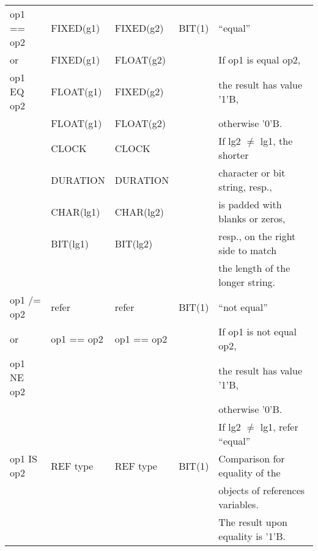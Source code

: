 \begin{table}
\begin{center}
\begin{tabular}{|l|l|l|l|l|}
op1 == op2       & FIXED(g1)       & FIXED(g2)       & BIT(1)               & ``equal''\\
or               & FIXED(g1)       & FLOAT(g2)       &                      & If op1 is equal op2,\\
op1 EQ op2
\index{EQ@\textbf{EQ}|textbf}
       & FLOAT(g1)       & FIXED(g2)       &                      & the result has value '1'B,\\
                 & FLOAT(g1)       & FLOAT(g2)       &                      & otherwise '0'B.\\
                 & CLOCK           & CLOCK           &                      & If lg2 $\neq$ lg1, the shorter\\
                 & DURATION        & DURATION        &                      & character or bit string, resp.,\\
                 & CHAR(lg1)       & CHAR(lg2)       &                      & is padded with blanks or zeros,\\
                 & BIT(lg1)        & BIT(lg2)        &                      & resp., on the right side to match\\
                 &                 &                 &                      & the length of the longer string.\\ \hline

op1 /= op2       & refer         & refer         & BIT(1)               & ``not equal''\\
or               & op1 == op2     & op1 == op2     &                      & If op1 is not equal op2,\\
op1 NE op2
\index{NE@\textbf{NE}|textbf}
       &                 &                 &                      & the result has value '1'B,\\
                 &                 &                 &                      & otherwise '0'B.\\
                 &                 &                 &                      & If lg2 $\neq$ lg1, refer ``equal''\\ \hline

op1 IS op2
\index{IS@\textbf{IS}|textbf}
       & REF type        & REF type        & BIT(1)               & Comparison for equality of the\\
                 &                 &                 &                      & objects of references variables.\\
                 &                 &                 &                      & The result upon equality is '1'B.\\ \hline


\end{tabular}
\end{center}
\end{table}
